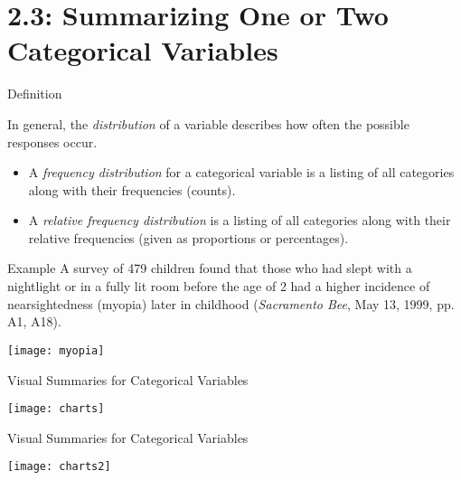 \documentclass[Lecture.tex]{subfiles}
\begin{document}
\section{2.3: Summarizing One or Two Categorical Variables}
\begin{frame}{Definition}
  \begin{defn}
  In general, the {\it distribution} of a variable describes how often the possible responses occur.
    \begin{itemize}
    \item<1->
      A {\it frequency distribution} for a categorical variable is a listing of all categories along with their frequencies (counts).
    \item<2->
      A {\it relative frequency distribution} is a listing of all categories along with their relative frequencies (given as proportions or percentages).
    \end{itemize}
  \end{defn}
\end{frame}




\begin{frame}{Example}
A survey of 479 children found that those who had slept with a nightlight or in a fully lit room before the age of 2 had a higher incidence of nearsightedness (myopia) later in childhood ({\it Sacramento Bee}, May 13, 1999, pp. A1, A18).
\begin{center}
\texttt{[image: myopia]}
\end{center}
\end{frame}

\begin{frame}{Visual Summaries for Categorical Variables}
\begin{center}
\texttt{[image: charts]}
\end{center}
\end{frame}

\begin{frame}{Visual Summaries for Categorical Variables}
\begin{center}
\texttt{[image: charts2]}
\end{center}
\end{frame}
\end{document}
